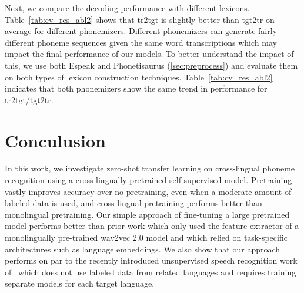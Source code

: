 \documentclass{article}
\begin{document}
Next, we compare the decoding performance with different lexicons.
Table~\ref{tab:cv_res_abl2} shows that tr2tgt is slightly better than tgt2tr on average for different phonemizers. 
Different phonemizers can generate fairly different phoneme sequences given the same word transcriptions which may impact the final performance of our models.
To better understand the impact of this, we use both Espeak and Phonetisaurus (\textsection\ref{sec:preprocess}) and evaluate them on both types of lexicon construction techniques.
Table~\ref{tab:cv_res_abl2} indicates that both phonemizers show the same trend in performance for tr2tgt/tgt2tr.

\section{Conculusion}

In this work, we investigate zero-shot transfer learning on cross-lingual phoneme recognition using a cross-lingually pretrained self-supervised model.
Pretraining vastly improves accuracy over no pretraining, even when a moderate amount of labeled data is used, and cross-lingual pretraining performs better than monolingual pretraining.
Our simple approach of fine-tuning a large pretrained model performs better than prior work which only used the feature extractor of a monolingually pre-trained wav2vec 2.0 model and which relied on task-specific architectures such as language embeddings.
We also show that our approach performs on par to the recently introduced unsupervised speech recognition work of~\cite{baevski2021unsupervised} which does not use labeled data from related languages and requires training separate models for each target language.

\end{document}
